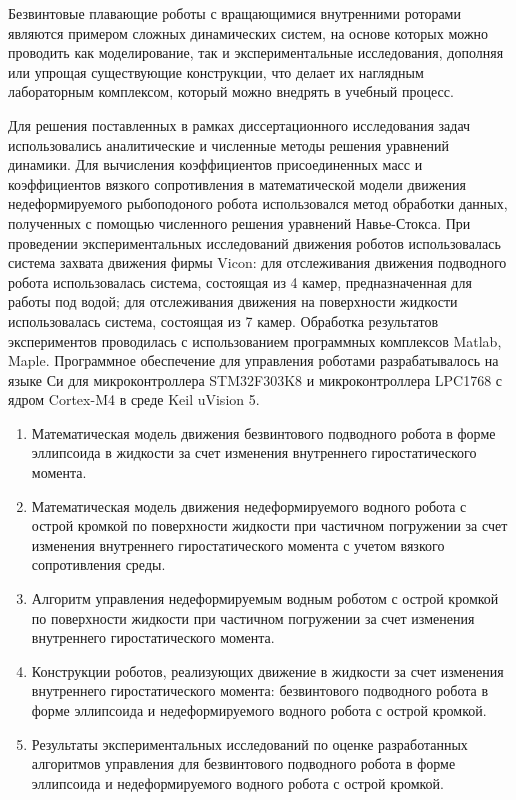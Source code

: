 Безвинтовые плавающие роботы с вращающимися внутренними роторами являются примером сложных динамических систем, на основе которых можно проводить как моделирование, так и экспериментальные исследования, дополняя или упрощая существующие конструкции, что делает их наглядным лабораторным комплексом, который можно внедрять в учебный процесс.

{\methods} Для решения поставленных в рамках диссертационного исследования задач использовались аналитические и численные методы решения уравнений динамики. Для вычисления коэффициентов присоединенных масс и коэффициентов вязкого сопротивления в математической модели движения недеформируемого рыбоподоного робота использовался метод обработки данных, полученных с помощью численного решения уравнений Навье-Стокса. При проведении экспериментальных исследований движения роботов использовалась система захвата движения фирмы Vicon: для отслеживания движения подводного робота использовалась система, состоящая из 4 камер, предназначенная для работы под водой; для отслеживания движения на поверхности жидкости использовалась система, состоящая из 7 камер. Обработка результатов экспериментов проводилась с использованием программных комплексов Matlab, Maple. Программное обеспечение для управления роботами разрабатывалось на языке Си для микроконтроллера STM32F303K8 и микроконтроллера LPC1768 с ядром Cortex-M4 в среде Keil uVision 5.

{}
\begin{enumerate}
  \item Математическая модель движения безвинтового подводного робота в форме эллипсоида в жидкости за счет изменения внутреннего гиростатического момента.
  \item Математическая модель движения недеформируемого водного робота с острой кромкой по поверхности жидкости при частичном погружении за счет изменения внутреннего гиростатического момента с учетом вязкого сопротивления среды.
  \item Алгоритм управления недеформируемым водным роботом с острой кромкой по поверхности жидкости при частичном погружении за счет изменения внутреннего гиростатического момента.
  \item Конструкции роботов, реализующих движение в жидкости за счет изменения внутреннего гиростатического момента:  безвинтового подводного робота в форме эллипсоида и недеформируемого водного робота с острой кромкой.
  \item Результаты экспериментальных исследований по оценке разработанных алгоритмов управления для безвинтового подводного робота в форме эллипсоида и недеформируемого водного робота с острой кромкой.
  
\end{enumerate}

